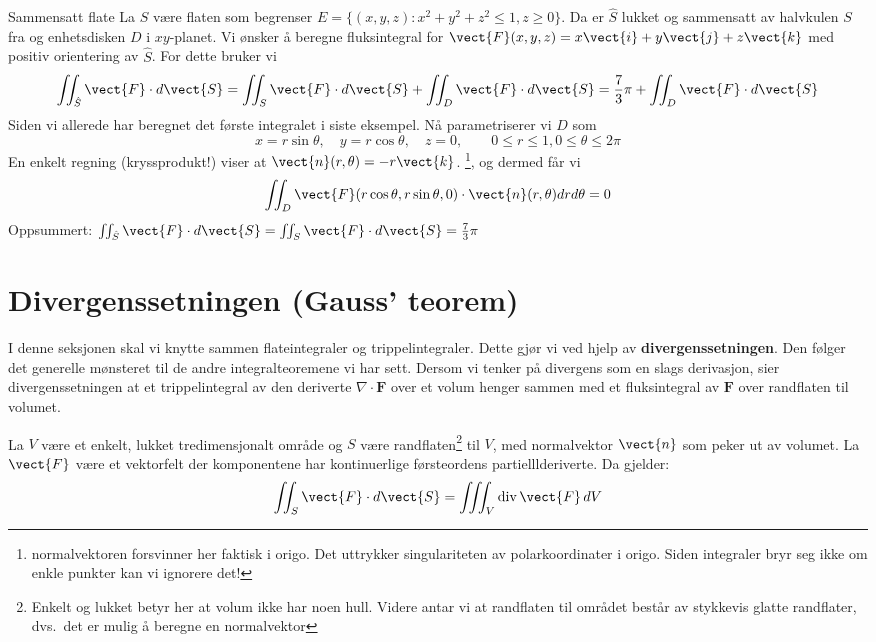 \begin{eks}{Sammensatt flate}
La $\hat{S}$ være flaten som begrenser $E=\{(x,y,z) \colon x^2+y^2+z^2\leq 1, z \geq 0\}$. 
Da er $\hat{S}$ lukket og sammensatt av halvkulen $S$ fra  og enhetsdisken $D$ i $xy$-planet. 
Vi ønsker å beregne fluksintegral for $\vect{F}(x,y,z)=x\vect{i}+y\vect{j}+z\vect{k}$
med positiv orientering av $\hat{S}$. 
For dette bruker vi 
\begin{align*}
\iint_{\hat{S}} \vect{F} \cdot d \vect{S} = \iint_S \vect{F} \cdot d \vect{S} + \iint_D \vect{F} \cdot d \vect{S} = \frac{7}{3} \pi + \iint_D \vect{F} \cdot d \vect{S} 
\end{align*}
Siden vi allerede har beregnet det første integralet i siste eksempel. 
Nå parametriserer vi $D$ som
\[x= r \sin \theta , \quad y = r \cos \theta, \quad z =0, \qquad 0 \leq r \leq 1, 0\leq \theta \leq 2 \pi\]
En enkelt regning (kryssprodukt!) viser at $\vect{n}(r,\theta) = -r \vect{k}$.
\footnote{normalvektoren forsvinner her faktisk i origo. Det uttrykker singulariteten av polarkoordinater i origo. Siden integraler bryr seg ikke om enkle punkter kan vi ignorere det!}, og dermed får vi \[\iint_D \vect{F}(r\cos \theta, r \sin \theta,0) \cdot \vect{n}(r,\theta) dr d\theta = 0   \]
Oppsummert: $\iint_{\hat{S}} \vect{F} \cdot d \vect{S} = \iint_S \vect{F} \cdot d \vect{S} = \frac{7}{3}\pi$
\end{eks}

%
%
%
\section{Divergenssetningen (Gauss' teorem)}\label{sect:gauss}

I denne seksjonen skal vi knytte sammen flateintegraler og trippelintegraler. 
Dette gjør vi ved hjelp av \textbf{divergenssetningen}. 
Den følger det generelle mønsteret til de andre integralteoremene vi har sett.  
Dersom vi tenker på divergens som en slags derivasjon, sier divergenssetningen at et trippelintegral av den deriverte 
$\nabla \cdot \mathbf{F}$ over et volum henger sammen med et fluksintegral av \(\mathbf{F}\) over randflaten til volumet. 

\begin{thm} \label{thm:divergens}
La \( V \) være et enkelt, lukket tredimensjonalt område og \( S \) være randflaten\footnote{Enkelt og lukket betyr her at volum ikke har noen hull. 
Videre antar vi at randflaten til området består av stykkevis glatte randflater, dvs.\ det er mulig å beregne en normalvektor} til \( V \), med normalvektor $\vect{n}$ som peker ut av volumet. 
La \( \vect{F} \) være et vektorfelt der komponentene har kontinuerlige førsteordens partielllderiverte. 
Da gjelder:
\[
\iint_S \vect{F} \cdot d\vect{S} = \iiint_V \mathrm{div} \, \vect{F} \, dV
\]
\end{thm}

